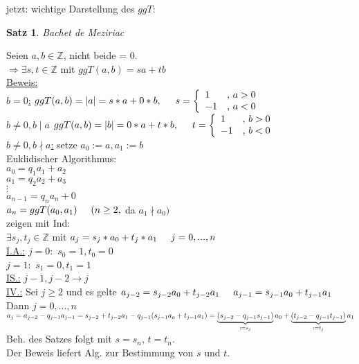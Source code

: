 \documentclass[a4paper,11pt]{article}
\newtheorem{satz}[definition]{Satz}
\newcommand{\hsp}{\hspace{5mm}}
\begin{document}
jetzt: wichtige Darstellung des $ggT$:
\begin{satz}
	Bachet de Meziriac
\end{satz}
Seien $a,b\in\mathbb{Z}$, nicht beide = 0. \\
$\Rightarrow\exists s,t\in\mathbb{Z}$ mit $ggT(a,b)=sa+tb$ \\
\underline{Beweis:} \\
\underline{$b=0$:} $ggT(a,b)=\vert a\vert=s*a+0*b,\hsp s=\left\{\begin{array}{ll}1&\text{, }a>0 \\ -1 & \text{, }a<0\end{array}\right.$ \\
\underline{$b\neq0, b\mid a$} $ggT(a,b)=\vert b\vert=0*a+t*b,\hsp t=\left\{\begin{array}{ll}1&\text{, }b>0 \\ -1 & \text{, }b<0\end{array}\right.$ \\
\underline{$b\neq0, b\nmid a$:} setze $a_0:=a, a_1:=b$ \\
Euklidischer Algorithmus: \\
$a_0=q_1a_1+a_2$ \\
$a_1=q_2a_2+a_3$ \\
$\vdots$ \\
$a_{n-1}=q_na_n+0$ \\
$a_n=ggT(a_0,a_1)\hsp(n\geq2,$ da $a_1\nmid a_0)$ \\
zeigen mit Ind: \\
$\exists s_j,t_j\in\mathbb{Z}$ mit $a_j=s_j*a_0+t_j*a_1\hsp j=0,...,n$ \\
\underline{I.A.:} $j=0:$ $s_0=1, t_0=0$ \\
$j=1:$ $s_1=0, t_1=1$ \\
\underline{IS.:} $j-1,j-2\rightarrow j$ \\
\underline{IV.:} Sei $j\geq2$ und es gelte $a_{j-2}=s_{j-2}a_0+t_{j-2}a_1\hsp a_{j-1}=s_{j-1}a_0+t_{j-1}a_1$ \\
Dann $j=0,...,n$ \\
$a_j=a_{j-2}-q_{j-1}a_{j-1} \\
=s_{j-2}+t_{j-2}a_1-q_{j-1}(s_{j-1}a_o+t_{j-1}a_1) \\
=\underbrace{(s_{j-2}-q_{j-1}s_{j-1})}_{:=s_j}a_0+\underbrace{(t_{j-2}-q_{j-1}t_{j-1})}_{:=t_j}a_1$ \\
Beh. des Satzes folgt mit $s=s_n$, $t=t_n$. \\
Der Beweis liefert Alg. zur Bestimmung von $s$ und $t$.
\end{document}
